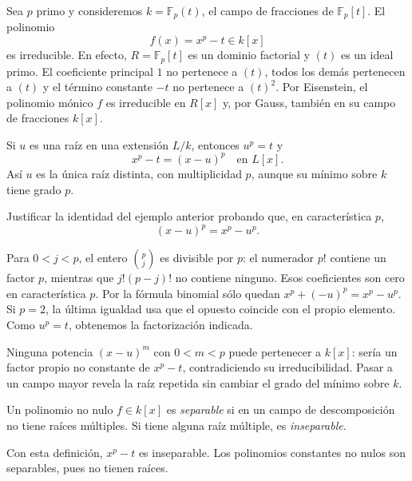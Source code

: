 \begin{ejem}\label{ejem:C25-inseparable}
Sea $p$ primo y consideremos $k=\mathbb F_p(t)$, el campo de fracciones de $\mathbb F_p[t]$. El polinomio
\[
f(x)=x^p-t\in k[x]
\]
es irreducible. En efecto, $R=\mathbb F_p[t]$ es un dominio factorial y $(t)$ es un ideal primo. El coeficiente principal $1$ no pertenece a $(t)$, todos los demás pertenecen a $(t)$ y el término constante $-t$ no pertenece a $(t)^2$. Por Eisenstein, el polinomio mónico $f$ es irreducible en $R[x]$ y, por Gauss, también en su campo de fracciones $k[x]$.

Si $u$ es una raíz en una extensión $L/k$, entonces $u^p=t$ y
\[
x^p-t=(x-u)^p\quad\text{en }L[x].
\]
Así $u$ es la única raíz distinta, con multiplicidad $p$, aunque su mínimo sobre $k$ tiene grado $p$.
\end{ejem}

\begin{ejer}\label{ejer:C25-binomial}
Justificar la identidad del ejemplo anterior probando que, en característica $p$,
\[
(x-u)^p=x^p-u^p.
\]
\end{ejer}
\begin{sol}
Para $0<j<p$, el entero $\binom pj$ es divisible por $p$: el numerador $p!$ contiene un factor $p$, mientras que $j!(p-j)!$ no contiene ninguno. Esos coeficientes son cero en característica $p$. Por la fórmula binomial sólo quedan $x^p+(-u)^p=x^p-u^p$. Si $p=2$, la última igualdad usa que el opuesto coincide con el propio elemento. Como $u^p=t$, obtenemos la factorización indicada.
\end{sol}
Ninguna potencia $(x-u)^m$ con $0<m<p$ puede pertenecer a $k[x]$: sería un factor propio no constante de $x^p-t$, contradiciendo su irreducibilidad. Pasar a un campo mayor revela la raíz repetida sin cambiar el grado del mínimo sobre $k$.

\begin{defi}
Un polinomio no nulo $f\in k[x]$ es \emph{separable} si en un campo de descomposición no tiene raíces múltiples. Si tiene alguna raíz múltiple, es \emph{inseparable}.
\end{defi}
Con esta definición, $x^p-t$ es inseparable. Los polinomios constantes no nulos son separables, pues no tienen raíces.

